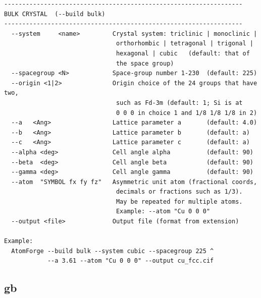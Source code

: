 \begin{lstlisting}
------------------------------------------------------------------
BULK CRYSTAL  (--build bulk)
------------------------------------------------------------------
  --system     <name>         Crystal system: triclinic | monoclinic |
                               orthorhombic | tetragonal | trigonal |
                               hexagonal | cubic   (default: that of
                               the space group)
  --spacegroup <N>            Space-group number 1-230  (default: 225)
  --origin <1|2>              Origin choice of the 24 groups that have two,
                               such as Fd-3m (default: 1; Si is at
                               0 0 0 in choice 1 and 1/8 1/8 1/8 in 2)
  --a   <Ang>                 Lattice parameter a       (default: 4.0)
  --b   <Ang>                 Lattice parameter b       (default: a)
  --c   <Ang>                 Lattice parameter c       (default: a)
  --alpha <deg>               Cell angle alpha          (default: 90)
  --beta  <deg>               Cell angle beta           (default: 90)
  --gamma <deg>               Cell angle gamma          (default: 90)
  --atom  "SYMBOL fx fy fz"   Asymmetric unit atom (fractional coords,
                               decimals or fractions such as 1/3).
                               May be repeated for multiple atoms.
                               Example: --atom "Cu 0 0 0"
  --output <file>             Output file (format from extension)

Example:
  AtomForge --build bulk --system cubic --spacegroup 225 ^
            --a 3.61 --atom "Cu 0 0 0" --output cu_fcc.cif
\end{lstlisting}

\clearpage

\subsection{gb}


